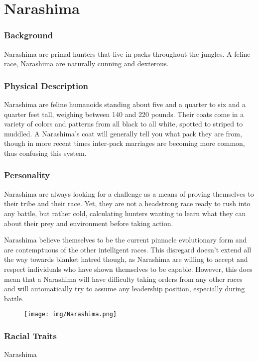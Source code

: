\chapter*{Narashima}

\subsection*{Background}

Narashima are primal hunters that live in packs throughout the jungles. A feline race, Narashima are naturally cunning and dexterous.

\subsection*{Physical Description}

Narashima are feline humanoids standing about five and a quarter to six and a quarter feet tall, weighing between 140 and 220 pounds. Their coats come in a variety of colors and patterns from all black to all white, spotted to striped to muddled. A Narashima’s coat will generally tell you what pack they are from, though in more recent times inter-pack marriages are becoming more common, thus confusing this system.

\subsection*{Personality}

Narashima are always looking for a challenge as a means of proving themselves to their tribe and their race. Yet, they are not a headstrong race ready to rush into any battle, but rather cold, calculating hunters wanting to learn what they can about their prey and environment before taking action.

Narashima believe themselves to be the current pinnacle evolutionary form and are contemptuous of the other intelligent races. This disregard doesn’t extend all the way towards blanket hatred though, as Narashima are willing to accept and respect individuals who have shown themselves to be capable. However, this does mean that a Narashima will have difficulty taking orders from any other races and will automatically try to assume any leadership position, especially during battle. 

\newpage

\begin{figure}[ht!]
	\texttt{[image: img/Narashima.png]}
\end{figure}

\subsection*{Racial Traits}
\begin{monsterbox}{Narashima}
	\vspace{.1in}
	\hline
	\stats[
	STR = +1,
	DEX = +1,
	VIT = -1,
	FOC = -1,
	WILL = +1
	]
	\hline
\end{monsterbox}